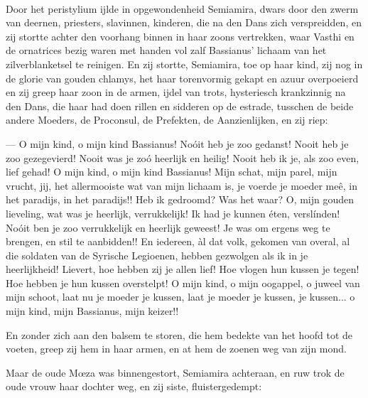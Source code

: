 \documentclass[a4paper, 12pt, oneside, dutch]{article}
\begin{document}
\paragraph{}
Door het peristylium ijlde in opgewondenheid Semiamira, dwars door den zwerm van deernen, priesters, slavinnen, kinderen, die na den Dans zich verspreidden, en zij stortte achter den voorhang binnen in haar zoons vertrekken, waar Vasthi en de ornatrices bezig waren met handen vol zalf Bassianus' lichaam van het zilverblanketsel te reinigen. En zij stortte, Semiamira, toe op haar kind, zij nog in de glorie van gouden chlamys, het haar torenvormig gekapt en azuur overpoeierd en zij greep haar zoon in de armen, ijdel van trots, hysteriesch krankzinnig na den Dans, die haar had doen rillen en sidderen op de estrade, tusschen de beide andere Moeders, de Proconsul, de Prefekten, de Aanzienlijken, en zij riep:

--- O mijn kind, o mijn kind Bassianus! Noóit heb je zoo gedanst! Nooit heb je zoo gezegevierd! Nooit was je zoó heerlijk en heilig! Nooit heb ik je, als zoo even, lief gehad! O mijn kind, o mijn kind Bassianus! Mijn schat, mijn parel, mijn vrucht, jij, het allermooiste wat van mijn lichaam is, je voerde je moeder meê, in het paradijs, in het paradijs!! Heb ik gedroomd? Was het waar? O, mijn gouden lieveling, wat was je heerlijk, verrukkelijk! Ik had je kunnen éten, verslínden! Noóit ben je zoo verrukkelijk en heerlijk geweest! Je was om ergens weg te brengen, en stil te aanbidden!! En iedereen, àl dat volk, gekomen van overal, al die soldaten van de Syrische Legioenen, hebben gezwolgen als ik in je heerlijkheid! Lievert, hoe hebben zij je allen lief! Hoe vlogen hun kussen je tegen! Hoe hebben je hun kussen overstelpt! O mijn kind, o mijn oogappel, o juweel van mijn schoot, laat nu je moeder je kussen, laat je moeder je kussen, je kussen... o mijn kind, mijn Bassianus, mijn keizer!!

En zonder zich aan den balsem te storen, die hem bedekte van het hoofd tot de voeten, greep zij hem in haar armen, en at hem de zoenen weg van zijn mond.

Maar de oude Mœza was binnengestort, Semiamira achteraan, en ruw trok de oude vrouw haar dochter weg, en zij siste, fluistergedempt:
\end{document}
